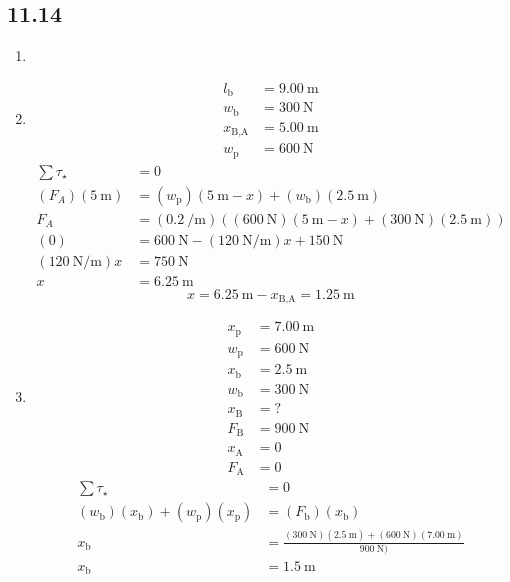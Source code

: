 \documentclass{article}
\begin{document}
\subsection{11.14}
\begin{enumerate}[label=\textbf{(\alph*)}]
	\item
	\item
		\begin{align*}
			l_\text{b} & = \SI{9.00}{\meter} \\
			w_\text{b} & = \SI{300}{\newton} \\
			x_\text{B,A} & = \SI{5.00}{\meter} \\
			w_\text{p} & = \SI{600}{\newton}
		\end{align*}
		\begin{align*}
			\sum \tau_\star & = 0 \\
			(F_A)(\SI{5}{\meter}) & = (w_\text{p})(\SI{5}{\meter} - x) + (w_\text{b})(\SI{2.5}{\meter}) \\
			F_A & = \left( \SI{0.2}{\per \meter} \right) \left( (\SI{600}{\newton})(\SI{5}{\meter} - x) + (\SI{300}{\newton})(\SI{2.5}{\meter}) \right) \\
			(0) & = \SI{600}{\newton} - (\SI{120}{\newton \per \meter})x + \SI{150}{\newton} \\
			(\SI{120}{\newton \per \meter})x & = \SI{750}{\newton} \\
			x & = \SI{6.25}{\meter}
		\end{align*}
		$$ x = \SI{6.25}{\meter} - x_\text{B,A} = \SI{1.25}{\meter} $$
	\item
		\begin{align*}
			x_\text{p} & = \SI{7.00}{\meter} \\
			w_\text{p} & = \SI{600}{\newton} \\
			x_\text{b} & = \SI{2.5}{\meter} \\
			w_\text{b} & = \SI{300}{\newton} \\
			x_\text{B} & = ? \\
			F_\text{B} & = \SI{900}{\newton} \\
			x_\text{A} & = 0 \\
			F_\text{A} & = 0
		\end{align*}
		\begin{align*}
			\sum \tau_\star & = 0 \\
			(w_\text{b})(x_\text{b}) + (w_\text{p})(x_\text{p}) & = (F_\text{b})(x_\text{b}) \\
			x_\text{b} & = \frac{(\SI{300}{\newton})(\SI{2.5}{\meter}) + (\SI{600}{\newton})(\SI{7.00}{\meter})}{\SI{900}{\newton})} \\
			x_\text{b} & = \SI{1.5}{\meter}
		\end{align*}
\end{enumerate}
\end{document}

